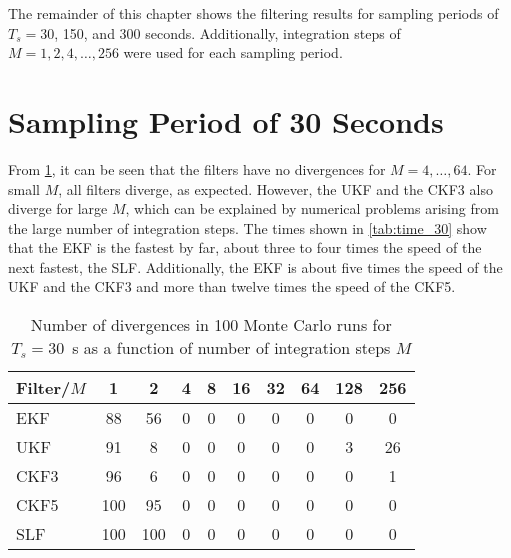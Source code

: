 \documentclass[../zhang_thesis.tex]{subfiles}
\begin{document}
The remainder of this chapter shows the filtering results for sampling periods of $T_s=30$, 150, and 300 seconds. Additionally, integration steps of $M=1,2,4,\dots,256$ were used for each sampling period.

\clearpage

\section{Sampling Period of 30 Seconds}

From \cref{tab:div_30}, it can be seen that the filters have no divergences for $M=4,\dots,64$. For small $M$, all filters diverge, as expected. However, the UKF and the CKF3 also diverge for large $M$, which can be explained by numerical problems arising from the large number of integration steps. The times shown in \cref{tab:time_30} show that the EKF is the fastest by far, about three to four times the speed of the next fastest, the SLF. Additionally, the EKF is about five times the speed of the UKF and the CKF3 and more than twelve times the speed of the CKF5. 

\begin{table}[h]
\centering
\caption{Number of divergences in 100 Monte Carlo runs for $T_s=30$~s as a function of number of integration steps $M$}
\begin{tabular}{@{}l*{9}{c}@{}}
\toprule
Filter/$M$ & 1   & 2   & 4 & 8 & 16 & 32 & 64 & 128 & 256 \\
\midrule
EKF        & 88  & 56  & 0 & 0 & 0  & 0 & 0 & 0 & 0   \\
UKF        & 91  & 8   & 0 & 0 & 0  & 0 & 0 & 3 & 26  \\
CKF3       & 96  & 6   & 0 & 0 & 0  & 0 & 0 & 0 & 1   \\
CKF5       & 100 & 95  & 0 & 0 & 0  & 0 & 0 & 0 & 0   \\
SLF        & 100 & 100 & 0 & 0 & 0  & 0 & 0 & 0 & 0   \\
\bottomrule
\end{tabular}
\label{tab:div_30}
\end{table}
\end{document}
